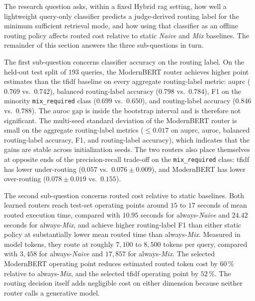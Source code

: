\documentclass[english, bibtex]{kththesis}               %
\numberwithin{listing}{chapter}
\begin{document}
The research question asks, within a fixed Hybrid \gls{rag} setting, how well a lightweight query-only classifier predicts a judge-derived routing label for the minimum sufficient retrieval mode, and how using that classifier as an offline routing policy affects routed cost relative to static \emph{Naive} and \emph{Mix} baselines. The remainder of this section answers the three sub-questions in turn.

The first sub-question concerns classifier accuracy on the routing label. On the held-out test split of $193$ queries, the ModernBERT router achieves higher point estimates than the \gls{tfidf} baseline on every aggregate routing-label metric: \gls{auprc} ($0.769$ vs.\ $0.742$), balanced routing-label accuracy ($0.798$ vs.\ $0.784$), F1 on the minority \texttt{mix\_required} class ($0.699$ vs.\ $0.650$), and routing-label accuracy ($0.846$ vs.\ $0.788$). The \gls{auroc} gap is inside the bootstrap interval and is therefore not significant. The multi-seed standard deviation of the ModernBERT router is small on the aggregate routing-label metrics ($\leq 0.017$ on \gls{auprc}, \gls{auroc}, balanced routing-label accuracy, F1, and routing-label accuracy), which indicates that the gains are stable across initialization seeds. The two routers also place themselves at opposite ends of the precision-recall trade-off on the \texttt{mix\_required} class: \gls{tfidf} has lower under-routing ($0.057$ vs.\ $0.076 \pm 0.009$), and ModernBERT has lower over-routing ($0.078 \pm 0.019$ vs.\ $0.155$).

The second sub-question concerns routed cost relative to static baselines. Both learned routers reach test-set operating points around $15$ to $17$ seconds of mean routed execution time, compared with $10.95$ seconds for always-\emph{Naive} and $24.42$ seconds for always-\emph{Mix}, and achieve higher routing-label F1 than either static policy at substantially lower mean routed time than always-\emph{Mix}. Measured in model tokens, they route at roughly $7{,}100$ to $8{,}500$ tokens per query, compared with $3{,}458$ for always-\emph{Naive} and $17{,}857$ for always-\emph{Mix}. The selected ModernBERT operating point reduces estimated routed token cost by $60\,\%$ relative to always-\emph{Mix}, and the selected \gls{tfidf} operating point by $52\,\%$. The routing decision itself adds negligible cost on either dimension because neither router calls a generative model.
\end{document}
